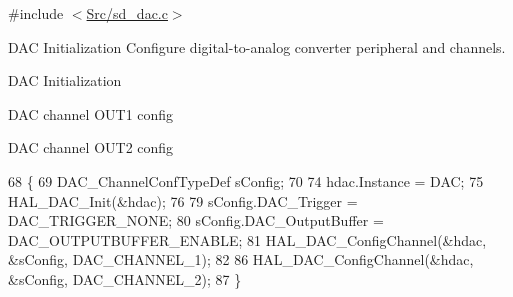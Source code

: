 {\ttfamily \#include $<$\mbox{\hyperlink{sd__dac_8c}{Src/sd\+\_\+dac.\+c}}$>$}



D\+AC Initialization Configure digital-\/to-\/analog converter peripheral and channels. 

D\+AC Initialization

D\+AC channel O\+U\+T1 config

D\+AC channel O\+U\+T2 config
\begin{DoxyCode}
68 \{
69     DAC\_ChannelConfTypeDef sConfig;
70 
74     hdac.Instance = DAC;
75     HAL\_DAC\_Init(&hdac);
76 
79     sConfig.DAC\_Trigger = DAC\_TRIGGER\_NONE;
80     sConfig.DAC\_OutputBuffer = DAC\_OUTPUTBUFFER\_ENABLE;
81     HAL\_DAC\_ConfigChannel(&hdac, &sConfig, DAC\_CHANNEL\_1);
82 
86     HAL\_DAC\_ConfigChannel(&hdac, &sConfig, DAC\_CHANNEL\_2);
87 \}
\end{DoxyCode}
